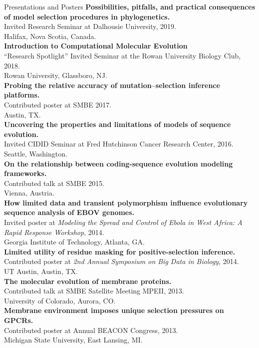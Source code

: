 \documentclass{resume} %
\begin{document}
\begin{rSection}{Presentations and Posters}
\textbf{Possibilities, pitfalls, and practical consequences of model selection procedures in phylogenetics.}
\\Invited Research Seminar at Dalhousie University, 2019.
\\ Halifax, Nova Scotia, Canada.\\

\textbf{Introduction to Computational Molecular Evolution}
\\``Research Spotlight'' Invited Seminar at the Rowan University Biology Club, 2018.
\\ Rowan University, Glassboro, NJ.\\

\textbf{Probing the relative accuracy of mutation--selection inference platforms.}
\\Contributed poster at SMBE 2017.
\\ Austin, TX.\\

\textbf{Uncovering the properties and limitations of models of sequence evolution.}
\\Invited CIDID Seminar at Fred Hutchinson Cancer Research Center, 2016.
\\ Seattle, Washington.\\

\textbf{On the relationship between coding-sequence evolution modeling frameworks.}
\\Contributed talk at SMBE 2015.
\\ Vienna, Austria.\\

\textbf{How limited data and transient polymorphism influence evolutionary sequence analysis of EBOV genomes.}
\\Invited poster at \emph{Modeling the Spread and Control of Ebola in West Africa: A Rapid Response Workshop}, 2014.
\\ Georgia Institute of Technology, Atlanta, GA.\\

\textbf{Limited utility of residue masking for positive-selection inference.}
\\Contributed poster at \emph{2nd Annual Symposium on Big Data in Biology}, 2014.
\\ UT Austin, Austin, TX.\\

\textbf{The molecular evolution of membrane proteins.}
\\Contributed talk at SMBE Satellite Meeting MPEII, 2013.
\\ University of Colorado, Aurora, CO. \\

\textbf{Membrane environment imposes unique selection pressures on GPCRs.}
\\Contributed poster at Annual BEACON Congress, 2013.
\\ Michigan State University, East Lansing, MI.


\end{rSection}
\end{document}
